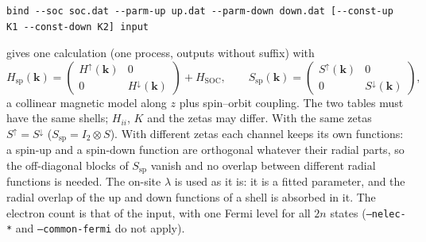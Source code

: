 \documentclass[11pt,a4paper]{article}
\newcommand{\opt}[1]{\texttt{#1}}
\newcommand{\Hsoc}{H_{\mathrm{SOC}}}
\begin{document}
\begin{lstlisting}[style=sh]
bind --soc soc.dat --parm-up up.dat --parm-down down.dat [--const-up K1 --const-down K2] input
\end{lstlisting}
gives one calculation (one process, outputs without suffix) with
\begin{equation}
H_{\mathrm{sp}}(\mathbf{k}) = \begin{pmatrix} H^\uparrow(\mathbf{k}) & 0\\ 0 & H^\downarrow(\mathbf{k})\end{pmatrix} + \Hsoc,
\qquad S_{\mathrm{sp}}(\mathbf{k}) = \begin{pmatrix} S^\uparrow(\mathbf{k}) & 0\\ 0 & S^\downarrow(\mathbf{k})\end{pmatrix},
\end{equation}
a collinear magnetic model along $z$ plus spin--orbit coupling. The two tables must have
the same shells; $H_{ii}$, $K$ and the zetas may differ. With the same zetas
$S^\uparrow=S^\downarrow$ ($S_{\mathrm{sp}}=I_2\otimes S$). With different zetas each channel keeps its
own functions: a spin-up and a spin-down function are orthogonal whatever their radial
parts, so the off-diagonal blocks of $S_{\mathrm{sp}}$ vanish and no overlap between
different radial functions is needed. The on-site $\lambda$ is used as it is: it is a
fitted parameter, and the radial overlap of the up and down functions of a shell is
absorbed in it. The electron count is that of the input, with one Fermi level for all $2n$
states (\opt{--nelec-*} and \opt{--common-fermi} do not apply).
\end{document}
